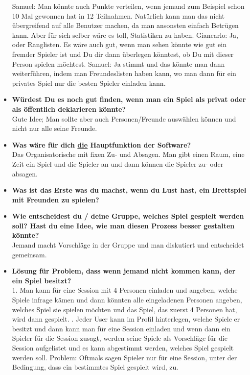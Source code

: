 \begin{appendix}
\begin{itemize}
    \newline
    Samuel: Man könnte auch Punkte verteilen, wenn jemand zum Beispiel schon 10 Mal gewonnen hat in 12 Teilnahmen. Natürlich kann man das nicht übergreifend auf alle Benutzer machen, da man ansonsten einfach Betrügen kann. Aber für sich selber wäre es toll, Statistiken zu haben.
    \newline
    Giancarlo: Ja, oder Ranglisten. Es wäre auch gut, wenn man sehen könnte wie gut ein fremder Spieler ist und Du dir dann überlegen könntest, ob Du mit dieser Person spielen möchtest.
    \newline
    Samuel: Ja stimmt und das könnte man dann weiterführen, indem man Freundeslisten haben kann, wo man dann für ein privates Spiel nur die besten Spieler einladen kann.
    \item \textbf{Würdest Du es noch gut finden, wenn man ein Spiel als privat oder als öffentlich deklarieren könnte?}\\
    Gute Idee; Man sollte aber auch Personen/Freunde auswählen können und nicht nur alle seine Freunde.
    \item \textbf{Was wäre für dich \underline{die} Hauptfunktion der Software?}\\
    Das Organisatorische mit fixen Zu- und Absagen. Man gibt einen Raum, eine Zeit ein Spiel und die Spieler an und dann können die Spieler zu- oder absagen.
    \item \textbf{Was ist das Erste was du machst, wenn du Lust hast, ein Brettspiel mit Freunden zu spielen?}\\
    \item \textbf{Wie entscheidest du / deine Gruppe, welches Spiel gespielt werden soll? Hast du eine Idee, wie man diesen Prozess besser gestalten könnte?}\\
    Jemand macht Vorschläge in der Gruppe und man diskutiert und entscheidet gemeinsam.
    \item \textbf{Lösung für Problem, dass wenn jemand nicht kommen kann, der ein Spiel besitzt?}\\
    1. Man kann für eine Session mit 4 Personen einladen und angeben, welche Spiele infrage kämen und dann könnten alle eingeladenen Personen angeben, welches Spiel sie spielen möchten und das Spiel, das zuerst 4 Personen hat, wird dann gespielt.
    . Jeder User kann im Profil hinterlegen, welche Spiele er besitzt und dann kann man für eine Session einladen und wenn dann ein Spieler für die Session zusagt, werden seine Spiele als Vorschläge für die Session aufgelistet und es kann abgestimmt werden, welches Spiel gespielt werden soll. Problem: Oftmals sagen Spieler nur für eine Session, unter der Bedingung, dass ein bestimmtes Spiel gespielt wird, zu.

\end{itemize}
\end{appendix}
